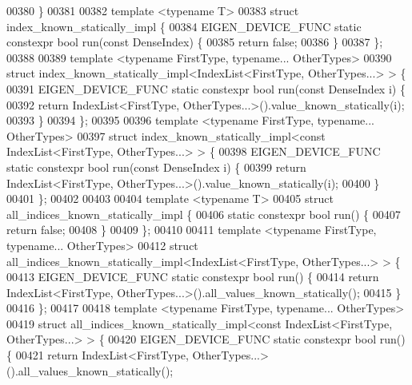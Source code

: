 \begin{DoxyCode}
00380 \}
00381 
00382 \textcolor{keyword}{template} <\textcolor{keyword}{typename} T>
00383 \textcolor{keyword}{struct }index\_known\_statically\_impl \{
00384   EIGEN\_DEVICE\_FUNC \textcolor{keyword}{static} constexpr \textcolor{keywordtype}{bool} run(\textcolor{keyword}{const} DenseIndex) \{
00385     \textcolor{keywordflow}{return} \textcolor{keyword}{false};
00386   \}
00387 \};
00388 
00389 \textcolor{keyword}{template} <\textcolor{keyword}{typename} FirstType, \textcolor{keyword}{typename}... OtherTypes>
00390 \textcolor{keyword}{struct }index\_known\_statically\_impl<IndexList<FirstType, OtherTypes...> > \{
00391   EIGEN\_DEVICE\_FUNC \textcolor{keyword}{static} constexpr \textcolor{keywordtype}{bool} run(\textcolor{keyword}{const} DenseIndex i) \{
00392     \textcolor{keywordflow}{return} IndexList<FirstType, OtherTypes...>().value\_known\_statically(i);
00393   \}
00394 \};
00395 
00396 \textcolor{keyword}{template} <\textcolor{keyword}{typename} FirstType, \textcolor{keyword}{typename}... OtherTypes>
00397 \textcolor{keyword}{struct }index\_known\_statically\_impl<const IndexList<FirstType, OtherTypes...> > \{
00398   EIGEN\_DEVICE\_FUNC \textcolor{keyword}{static} constexpr \textcolor{keywordtype}{bool} run(\textcolor{keyword}{const} DenseIndex i) \{
00399     \textcolor{keywordflow}{return} IndexList<FirstType, OtherTypes...>().value\_known\_statically(i);
00400   \}
00401 \};
00402 
00403 
00404 \textcolor{keyword}{template} <\textcolor{keyword}{typename} T>
00405 \textcolor{keyword}{struct }all\_indices\_known\_statically\_impl \{
00406   \textcolor{keyword}{static} constexpr \textcolor{keywordtype}{bool} run() \{
00407     \textcolor{keywordflow}{return} \textcolor{keyword}{false};
00408   \}
00409 \};
00410 
00411 \textcolor{keyword}{template} <\textcolor{keyword}{typename} FirstType, \textcolor{keyword}{typename}... OtherTypes>
00412 \textcolor{keyword}{struct }all\_indices\_known\_statically\_impl<IndexList<FirstType, OtherTypes...> > \{
00413   EIGEN\_DEVICE\_FUNC \textcolor{keyword}{static} constexpr \textcolor{keywordtype}{bool} run() \{
00414     \textcolor{keywordflow}{return} IndexList<FirstType, OtherTypes...>().all\_values\_known\_statically();
00415   \}
00416 \};
00417 
00418 \textcolor{keyword}{template} <\textcolor{keyword}{typename} FirstType, \textcolor{keyword}{typename}... OtherTypes>
00419 \textcolor{keyword}{struct }all\_indices\_known\_statically\_impl<const IndexList<FirstType, OtherTypes...> > \{
00420   EIGEN\_DEVICE\_FUNC \textcolor{keyword}{static} constexpr \textcolor{keywordtype}{bool} run() \{
00421     \textcolor{keywordflow}{return} IndexList<FirstType, OtherTypes...>().all\_values\_known\_statically();

\end{DoxyCode}
